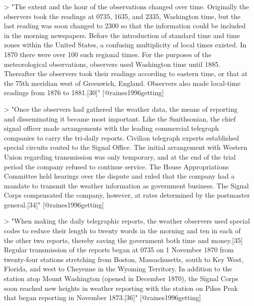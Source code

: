 > "The extent and the hour of the observations changed over time. Originally the
observers took the readings at 0735, 1635, and 2335, Washington time, but the
last reading was soon changed to 2300 so that the information could be included
in the morning newspapers. Before the introduction of standard time and time
zones within the United States, a confusing multiplicity of local times existed.
In 1870 there were over 100 such regional times. For the purposes of the
meteorological observations, observers used Washington time until 1885.
Thereafter the observers took their readings according to eastern time, or that
at the 75th meridian west of Greenwich, England. Observers also made local-time
readings from 1876 to 1881.[30]" [@raines1996getting]

> "Once the observers had gathered the weather data, the means of reporting and
disseminating it became most important. Like the Smithsonian, the chief signal
officer made arrangements with the leading commercial telegraph companies to
carry the tri-daily reports. Civilian telegraph experts established special
circuits routed to the Signal Office. The initial arrangement with Western Union
regarding transmission was only temporary, and at the end of the trial period
the company refused to continue service. The House Appropriations Committee held
hearings over the dispute and ruled that the company had a mandate to transmit
the weather information as government business. The Signal Corps compensated the
company, however, at rates determined by the postmaster general.[34]" [@raines1996getting]

> "When making the daily telegraphic reports, the weather observers used special
codes to reduce their length to twenty words in the morning and ten in each of
the other two reports, thereby saving the government both time and money.[35]
Regular transmission of the reports began at 0735 on 1 November 1870 from
twenty-four stations stretching from Boston, Massachusetts, south to Key West,
Florida, and west to Cheyenne in the Wyoming Territory. In addition to the
station atop Mount Washington (opened in December 1870), the Signal Corps soon
reached new heights in weather reporting with the station on Pikes Peak that
began reporting in November 1873.[36]" [@raines1996getting]

